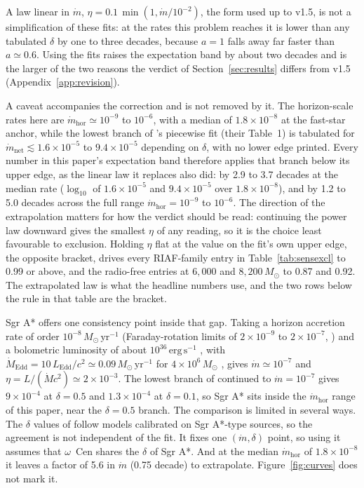 \documentclass[11pt]{article}
\newcommand{\msun}{\ensuremath{M_\odot}}
\newcommand{\ocen}{$\omega$~Cen}
\begin{document}
A law linear in $\dot{m}$, $\eta = 0.1\,\min(1, \dot{m}/10^{-2})$, the form used up to v1.5, is not a simplification of these fits: at the rates this problem reaches it is lower than any tabulated $\delta$ by one to three decades, because $a = 1$ falls away far faster than $a \simeq 0.6$. Using the fits raises the expectation band by about two decades and is the larger of the two reasons the verdict of Section~\ref{sec:results} differs from v1.5 (Appendix~\ref{app:revision}).

A caveat accompanies the correction and is not removed by it. The horizon-scale rates here are $\dot{m}_{\mathrm{hor}} \simeq 10^{-9}$ to $10^{-6}$, with a median of $1.8\times10^{-8}$ at the fast-star anchor, while the lowest branch of \citeauthor{XieYuan2012}'s piecewise fit (their Table~1) is tabulated for $\dot{m}_{\mathrm{net}} \lesssim 1.6\times10^{-5}$ to $9.4\times10^{-5}$ depending on $\delta$, with no lower edge printed. Every number in this paper's expectation band therefore applies that branch below its upper edge, as the linear law it replaces also did: by 2.9 to 3.7 decades at the median rate ($\log_{10}$ of $1.6\times10^{-5}$ and $9.4\times10^{-5}$ over $1.8\times10^{-8}$), and by 1.2 to 5.0 decades across the full range $\dot{m}_{\mathrm{hor}} = 10^{-9}$ to $10^{-6}$. The direction of the extrapolation matters for how the verdict should be read: continuing the power law downward gives the smallest $\eta$ of any reading, so it is the choice least favourable to exclusion. Holding $\eta$ flat at the value on the fit's own upper edge, the opposite bracket, drives every RIAF-family entry in Table~\ref{tab:sensexcl} to 0.99 or above, and the radio-free entries at $6{,}000$ and $8{,}200\,\msun$ to 0.87 and 0.92. The extrapolated law is what the headline numbers use, and the two rows below the rule in that table are the bracket.

Sgr A* offers one consistency point inside that gap. Taking a horizon accretion rate of order $10^{-8}\,\msun\,\mathrm{yr^{-1}}$ (Faraday-rotation limits of $2\times10^{-9}$ to $2\times10^{-7}$, \citealt{Marrone2007}) and a bolometric luminosity of about $10^{36}\,\mathrm{erg\,s^{-1}}$ \citep{YuanNarayan2014}, with $\dot{M}_{\mathrm{Edd}} = 10\,L_{\mathrm{Edd}}/c^{2} \simeq 0.09\,\msun\,\mathrm{yr^{-1}}$ for $4\times10^{6}\,\msun$ \citep{EHT2022SgrAI}, gives $\dot{m} \simeq 10^{-7}$ and $\eta = L/(\dot{M}c^{2}) \simeq 2\times10^{-3}$. The lowest branch of \citeauthor{XieYuan2012} continued to $\dot{m} = 10^{-7}$ gives $9\times10^{-4}$ at $\delta = 0.5$ and $1.3\times10^{-4}$ at $\delta = 0.1$, so Sgr A* sits inside the $\dot{m}_{\mathrm{hor}}$ range of this paper, near the $\delta = 0.5$ branch. The comparison is limited in several ways. The $\delta$ values of \citet{XieYuan2012} follow models calibrated on Sgr A*-type sources, so the agreement is not independent of the fit. It fixes one $(\dot{m}, \delta)$ point, so using it assumes that \ocen{} shares the $\delta$ of Sgr A*. And at the median $\dot{m}_{\mathrm{hor}}$ of $1.8\times10^{-8}$ it leaves a factor of 5.6 in $\dot{m}$ (0.75 decade) to extrapolate. Figure~\ref{fig:curves} does not mark it.
\end{document}
